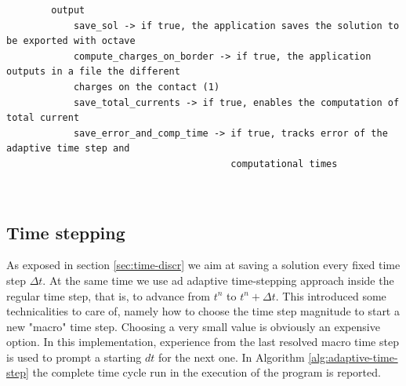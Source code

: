 \documentclass[11pt,a4paper]{article}
\begin{document}
\begin{minipage}{\textwidth}
	\vspace{3mm}
	\small
	\begin{verbatim}
		output
		    save_sol -> if true, the application saves the solution to be exported with octave
		    compute_charges_on_border -> if true, the application outputs in a file the different
		    charges on the contact (1)
		    save_total_currents -> if true, enables the computation of total current
		    save_error_and_comp_time -> if true, tracks error of the adaptive time step and
		                                computational times
	\end{verbatim}
\end{minipage}\\

\subsection{Time stepping}\label{sec:timecycle}
As exposed in section \ref{sec:time-discr} we aim at saving a solution every fixed time step \(\Delta t\). At the same time we use ad adaptive time-stepping approach inside the regular time step, that is, to advance from \(t^n\) to \(t^n+\Delta t\). This introduced some technicalities to care of, namely how to choose the time step magnitude to start a new "macro" time step. Choosing a very small value is obviously an expensive option. In this implementation, experience from the last resolved macro time step is used to prompt a starting \(dt\) for the next one. In Algorithm \ref{alg:adaptive-time-step} the complete time cycle run in the execution of the program is reported.
\end{document}
